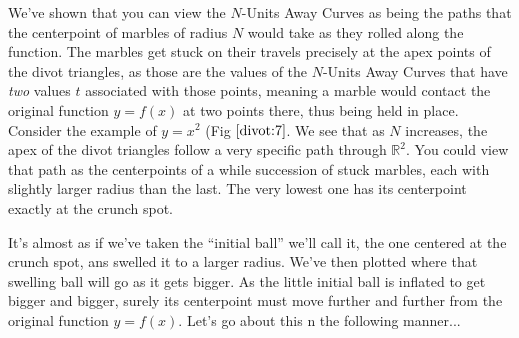 We've shown that you can view the $N$-Units Away Curves as being the paths that the centerpoint of marbles of radius $N$ would take as they rolled along the function. The marbles get stuck on their travels precisely at the apex points of the divot triangles, as those are the values of the $N$-Units Away Curves that have \textit{two} values $t$ associated with those points, meaning a marble would contact the original function $y = f(x)$ at two points there, thus being held in place. Consider the example of $y = x^2$ (Fig $\ref{divot:7}$. We see that as $N$ increases, the apex of the divot triangles follow a very specific path through $\mathbb{R}^2$. You could view that path as the centerpoints of a while succession of stuck marbles, each with slightly larger radius than the last. The very lowest one has its centerpoint exactly at the crunch spot.

It's almost as if we've taken the ``initial ball'' we'll call it, the one centered at the crunch spot, ans swelled it to a larger radius. We've then plotted where that swelling ball will go as it gets bigger. As the little initial ball is inflated to get bigger and bigger, surely its centerpoint must move further and further from the original function $y = f(x)$. Let's go about this n the following manner...

\renewcommand\w{0.4\textwidth}
\renewcommand\fw{0.9\linewidth}

